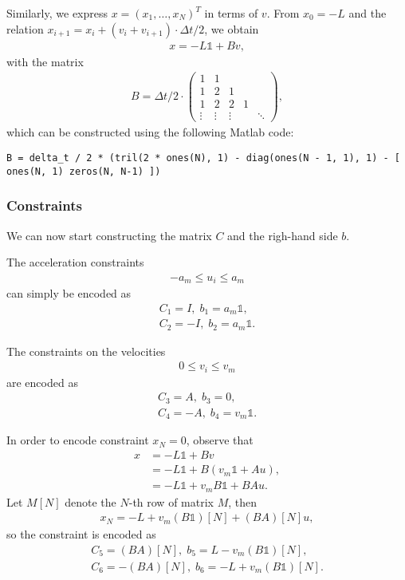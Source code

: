 \documentclass[a4paper]{article}
\theoremstyle{definition}
\theoremstyle{plain}
\begin{document}
Similarly, we express $x = {(x_{1}, \dots, x_{N})}^{T}$ in terms of $v$.
From $x_{0} = -L$ and the relation $x_{i+1} = x_{i} + (v_{i} + v_{i+1}) \cdot \Delta t / 2$, we obtain
\begin{align*}
  x = -L \mathds{1} + Bv ,
\end{align*}
with the matrix
\begin{align*}
  B = \Delta t / 2 \cdot
  \begin{pmatrix}
    1 & 1 \\
    1 & 2 & 1 \\
    1 & 2 & 2 & 1 \\
    \vdots & \vdots & \vdots & \; & \ddots
  \end{pmatrix} ,
\end{align*}
which can be constructed using the following Matlab code:
\begin{lstlisting}[style=Matlab-editor]
  B = delta_t / 2 * (tril(2 * ones(N), 1) - diag(ones(N - 1, 1), 1) - [ ones(N, 1) zeros(N, N-1) ])
\end{lstlisting}

\subsubsection*{Constraints}

We can now start constructing the matrix $C$ and the righ-hand side $b$.

The acceleration constraints
\begin{align*}
  -a_{m} \leq u_{i} \leq a_{m}
\end{align*}
can simply be encoded as
\begin{align*}
  C_{1} = I, \; b_{1} = a_{m} \mathds{1} , \\
  C_{2} = -I, \; b_{2} = a_{m} \mathds{1} .
\end{align*}

The constraints on the velocities
\begin{align*}
  0 \leq v_{i} \leq v_{m}
\end{align*}
are encoded as
\begin{align*}
  C_{3} = A, \; b_{3} = 0 , \\
  C_{4} = -A, \; b_{4} = v_{m} \mathds{1} .
\end{align*}


In order to encode constraint $x_{N} = 0$, observe that
\begin{align*}
  x &= -L \mathds{1} + Bv \\
    &= -L \mathds{1} + B(v_{m} \mathds{1} + Au) , \\
    &= -L \mathds{1} +  v_{m} B \mathds{1} + BA u .
\end{align*}
Let $M[N]$ denote the $N$-th row of matrix $M$, then
\begin{align*}
  x_{N} = -L + v_{m}(B \mathds{1})[N] + (BA)[N]u ,
\end{align*}
so the constraint is encoded as
\begin{align*}
  C_{5} = (BA)[N], \; b_{5} = L - v_{m} (B \mathds{1})[N] , \\
  C_{6} = -(BA)[N], \; b_{6} = -L + v_{m} (B \mathds{1})[N] .
\end{align*}
\end{document}
